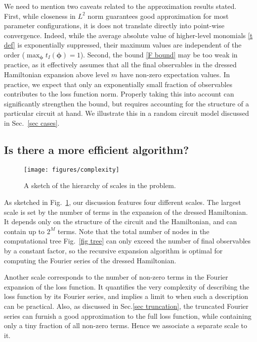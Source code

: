 \documentclass[twocolumn, amsfonts, amssymb, aps, nofootinbib]{revtex4-2}
\begin{document}
We need to mention two caveats related to the approximation results stated. First, while closeness in $L^2$ norm guarantees good approximation for most parameter configurations, it is does not translate directly into point-wise convergence. Indeed, while the average absolute value of higher-level monomials \eqref{t def} is exponentially suppressed, their maximum values are independent of the order ($\operatorname{max}_{\pmb\phi}{t}_{I}(\pmb\phi)=1$). Second, the bound \eqref{F bound} may be too weak in practice, as it effectively assumes that all the final observables in the dressed Hamiltonian expansion above level $m$ have non-zero expectation values. In practice, we expect that only an exponentially small fraction of observables contributes to the loss function norm. Properly taking this into account can significantly strengthen the bound, but requires accounting for the structure of a particular circuit at hand. We illustrate this in a random circuit model discussed in Sec.~\ref{sec cases}.
\subsection{Is there a more efficient algorithm?} \label{sec complexity}
\begin{figure}
	\texttt{[image: figures/complexity]}
	\caption{A sketch of the hierarchy of scales in the problem.}
	\label{fig complexity}
\end{figure}
As sketched in Fig.~\ref{fig complexity}, our discussion features four different scales. The largest scale is set by the number of terms in the expansion of the dressed Hamiltonian. It depends only on the structure of the circuit and the Hamiltonian, and can contain up to $2^M$ terms. Note that the total number of nodes in the computational tree Fig.~\ref{fig tree} can only exceed the number of final observables by a constant factor, so the recursive expansion algorithm is optimal for computing the Fourier series of the dressed Hamiltonian.

Another scale corresponds to the number of non-zero terms in the Fourier expansion of the loss function. It quantifies the very complexity of describing the loss function by its Fourier series, and implies a limit to when such a description can be practical. Also, as discussed in Sec.\eqref{sec truncation}, the truncated Fourier series can furnish a good approximation to the full loss function, while containing only a tiny fraction of all non-zero terms. Hence we associate a separate scale to it.
\end{document}
